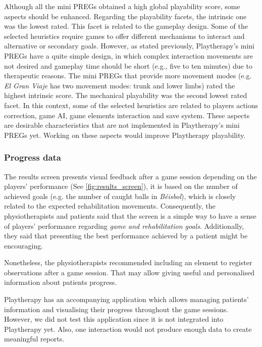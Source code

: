 Although all the mini \acp{PREG} obtained a high global playability score, some aspects should be enhanced. Regarding the playability facets, the intrinsic one was the lowest rated. This facet is related to the gameplay design. Some of the selected heuristics require games to offer different mechanisms to interact and alternative or secondary goals. However, as stated previously, Playtherapy's mini \acp{PREG} have a quite simple design, in which complex interaction movements are not desired and gameplay time should be short (e.g., five to ten minutes) due to therapeutic reasons. The mini \acp{PREG} that provide more movement modes (e.g. \textit{El Gran Viaje} has two movement modes: trunk and lower limbs) rated the highest intrinsic score. The mechanical playability was the second lowest rated facet. In this context, some of the selected heuristics are related to players actions correction, game \ac{AI}, game elements interaction and save system. These aspects are desirable characteristics that are not implemented in Playtherapy's mini \acp{PREG} yet. Working on these aspects would improve Playtherapy playability.

\subsubsection{Progress data}

The results screen presents visual feedback after a game session depending on the players' performance (See \autoref{fig:results_screen}), it is based on the number of achieved goals (e.g. the number of caught balls in \textit{B\'eisbol}), which is closely related to the expected rehabilitation movements. Consequently, the physiotherapists and patients said that the screen is a simple way to have a sense of players' performance regarding \textit{game and rehabilitation goals}. Additionally, they said that presenting the best performance achieved by a patient might be encouraging.

Nonetheless, the physiotherapists recommended including an element to register observations after a game session. That may allow giving useful and personalised information about patients progress.

Playtherapy has an accompanying application which allows managing patients' information and visualising their progress throughout the game sessions. However, we did not test this application since it is not integrated into Playtherapy yet. Also, one interaction would not produce enough data to create meaningful reports.

